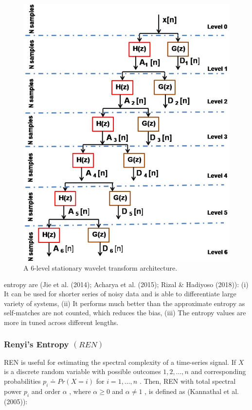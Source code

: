 \begin{figure}[htbp]
\centering
\includegraphics[width=0.8\linewidth]{images/bdc0ca10bcfc62f524c3777c4b29c1e9cf0fd8c2601ee9fd91c8da1eef1be617.jpg}
\caption{A 6-level stationary wavelet transform architecture.}
\label{fig:4}
\end{figure}


entropy are (Jie et al. (2014); Acharya et al. (2015); Rizal \& Hadiyoso (2018)): (i) It can be used for shorter series of noisy data and is able to differentiate large variety of systems, (ii) It performs much better than the approximate entropy as self-matches are not counted, which reduces the bias, (iii) The entropy values are more in tuned across different lengths.

\subsubsection{Renyi’s Entropy $(R E N)$}

REN is useful for estimating the spectral complexity of a time-series signal. If $X$ is a discrete random variable with possible outcomes $1,2,\ldots,n$ and corresponding probabilities $p_{i}\doteq P r(X=i)$ for $i=1,\ldots,n$ . Then, REN with total spectral power $p_{i}$ and order $\alpha$ , where $\alpha\geq0$ and $\alpha\neq1$ , is defined as (Kannathal et al. (2005)):

